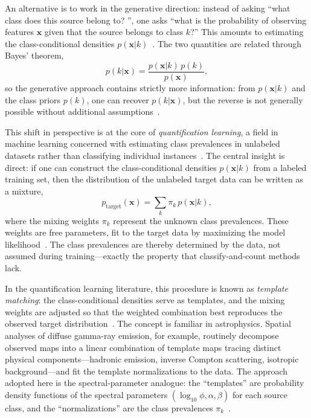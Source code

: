 An alternative is to work in the generative direction: instead of asking ``what class does this source belong to?
'', one asks ``what is the probability of observing features $\mathbf{x}$ given that the source belongs to class $k$?'' This amounts to estimating the class-conditional densities $p(\mathbf{x}|k)$~\cite{Amerio:2025fhz}. The two quantities are related through Bayes' theorem,
\begin{equation}
	p(k|\mathbf{x}) = \frac{p(\mathbf{x}|k)\,p(k)}{p(\mathbf{x})},
	\label{eq:bayes_generative}
\end{equation}
so the generative approach contains strictly more information: from $p(\mathbf{x}|k)$ and the class priors $p(k)$, one can recover $p(k|\mathbf{x})$, but the reverse is not generally possible without additional assumptions~\cite{Amerio:2025fhz}.

This shift in perspective is at the core of \textit{quantification learning}, a field in machine learning concerned with estimating class prevalences in unlabeled datasets rather than classifying individual instances~\cite{10.1145/3117807_Gonzalez_quantification, esuli2023learning}.
The central insight is direct: if one can construct the class-conditional densities $p(\mathbf{x}|k)$ from a labeled training set, then the distribution of the unlabeled target data can be written as a mixture,
\begin{equation}
	p_\mathrm{target}(\mathbf{x}) = \sum_k \pi_k\, p(\mathbf{x}|k),
	\label{eq:mixture_generic}
\end{equation}
where the mixing weights $\pi_k$ represent the unknown class prevalences.
These weights are free parameters, fit to the target data by maximizing the model likelihood~\cite{10.1145/3117807_Gonzalez_quantification, 2024arXiv240100490M}.
The class prevalences are thereby determined by the data, not assumed during training---exactly the property that classify-and-count methods lack.

In the quantification learning literature, this procedure is known as \textit{template matching}: the class-conditional densities serve as templates, and the mixing weights are adjusted so that the weighted combination best reproduces the observed target distribution~\cite{2024arXiv240100490M}.
The concept is familiar in astrophysics.
Spatial analyses of diffuse gamma-ray emission, for example, routinely decompose observed maps into a linear combination of template maps tracing distinct physical components---hadronic emission, inverse Compton scattering, isotropic background---and fit the template normalizations to the data.
The approach adopted here is the spectral-parameter analogue: the ``templates'' are probability density functions of the spectral parameters $(\log_{10}\phi, \alpha, \beta)$ for each source class, and the ``normalizations'' are the class prevalences $\pi_k$~\cite{Amerio:2025fhz}.

